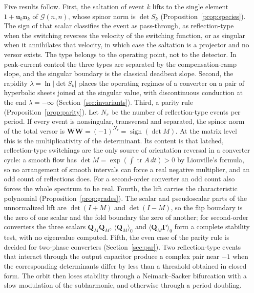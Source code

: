 \documentclass[journal]{IEEEtran}
\newcommand{\Gnn}{\mathcal{G}(n,n)}
\newcommand{\rev}[1]{\widetilde{#1}}
\newcommand{\sgn}{\operatorname{sign}}
\begin{document}
Five results follow. First, the saltation of event $k$ lifts to the single
element $1+\bm{u}_k\bm{n}_k$ of $\Gnn$, whose spinor norm is $\det S_k$
(Proposition~\ref{prop:species}). The sign of that scalar classifies the
event as pass-through, as reflection-type when the switching reverses the
velocity of the switching function, or as singular when it annihilates that
velocity, in which case the saltation is a projector and no versor exists.
The type belongs to the operating point, not to the detector. In
peak-current control the three types are separated by the compensation-ramp
slope, and the singular boundary is the classical deadbeat slope. Second, the
rapidity $\lambda=\ln\lvert\det S_k\rvert$ places the operating regimes of a
converter on a pair of hyperbolic sheets joined at
the singular value, with
discontinuous conduction at the end $\lambda=-\infty$
(Section~\ref{sec:invariants}). Third, a parity rule
(Proposition~\ref{prop:parity}). Let $N_r$ be the number of reflection-type
events per period. If every event is nonsingular, transversal and separated,
the spinor norm of the total versor is
$\bm{W}\rev{\bm{W}}=(-1)^{N_r}=\sgn(\det M)$. At the matrix level this is the
multiplicativity of the determinant. Its content is that latched,
reflection-type switchings are the only source of orientation reversal in a
converter cycle: a smooth
flow has $\det M=\exp(\int\operatorname{tr}A\,dt)>0$ by Liouville's formula, so no arrangement of smooth intervals can force a
real negative multiplier, and an odd count of reflections does. For a
second-order converter an odd count also forces the whole spectrum to be
real. Fourth, the lift carries the characteristic polynomial
(Proposition~\ref{prop:grades}). The scalar and pseudoscalar parts of the
unnormalized lift are $\det(I+M)$ and $\det(I-M)$, so the flip boundary is
the zero of one scalar and the fold boundary the zero of another; for
second-order converters the three scalars $\bm{Q}_M\rev{\bm{Q}}_M$,
$\langle\bm{Q}_M\rangle_0$ and $\langle\bm{Q}_M\bm{\Gamma}\rangle_0$ form a
complete stability test, with no eigenvalue computed. Fifth, the even case of
the parity rule is decided for two-phase converters
(Section~\ref{sec:par}). Two reflection-type events that interact through the
output capacitor produce a complex pair near $-1$ when the corresponding
determinants differ by less than a threshold obtained in closed form. The
orbit then loses stability through a Neimark--Sacker bifurcation with a slow
modulation of the subharmonic, and otherwise through a period doubling.
\end{document}

